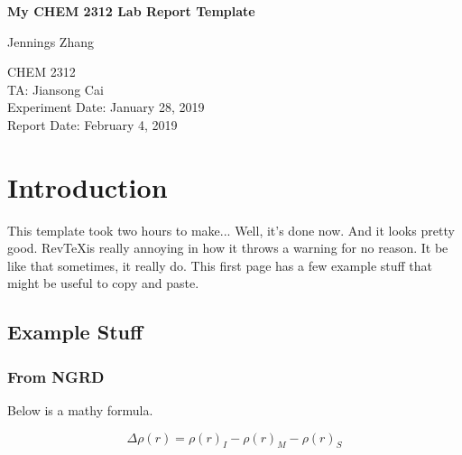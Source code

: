 \documentclass[letterpaper,amsmath,amssymb,prb,preprint,12pt]{revtex4-1}%
\begin{document}
\setcounter{page}{0}
\raggedbottom


\begin{titlepage}
\begin{center}

\vspace*{6cm}
\Large
\textbf{My CHEM 2312 Lab Report Template}

\vspace{0.5cm}
\large
Jennings Zhang
\vspace{1.5cm}

CHEM 2312\\
TA: Jiansong Cai\\
Experiment Date: January 28, 2019\\
Report Date: February 4, 2019

\end{center}
\thispagestyle{empty} %
\end{titlepage}


\section{Introduction}

This template took two hours to make... Well, it's done now. And it looks pretty good. Rev\TeX is really annoying in how it throws a warning for no reason. It be like that sometimes, it really do. This first page has a few example stuff that might be useful to copy and paste.

\subsection{Example Stuff}

\subsubsection{From NGRD}

Below is a mathy formula.

\[\Delta\rho(r)=\rho(r)_{I}-\rho(r)_{M}-\rho(r)_{S}\]
\end{document}
